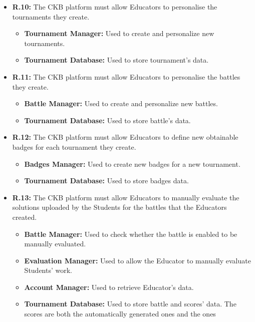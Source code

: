 \documentclass{article}
\begin{document}
{\begin{itemize}
\begin{itemize}
          \end{itemize}
    \item \textbf{R.10:} The CKB platform must allow Educators to personalise the tournaments they create.
          \begin{itemize}
              \item \textbf{Tournament Manager:} Used to create and personalize new tournaments.
              \item \textbf{Tournament Database:} Used to store tournament's data.
          \end{itemize}
    \item \textbf{R.11:} The CKB platform must allow Educators to personalise the battles they create.
          \begin{itemize}
              \item \textbf{Battle Manager:} Used to create and personalize new battles.
              \item \textbf{Tournament Database:} Used to store battle's data.
          \end{itemize}
    \item \textbf{R.12:} The CKB platform must allow Educators to define new obtainable badges for each tournament they
          create.
          \begin{itemize}
              \item \textbf{Badges Manager:} Used to create new badges for a new tournament.
              \item \textbf{Tournament Database:} Used to store badges data.
          \end{itemize}
    \item \textbf{R.13:} The CKB platform must allow Educators to manually evaluate the solutions uploaded by the Students for the battles that
          the Educators created.
          \begin{itemize}
              \item \textbf{Battle Manager:} Used to check whether the battle is enabled to be manually
              evaluated.
              \item \textbf{Evaluation Manager:} Used to allow the Educator to manually evaluate Students'
              work.
              \item \textbf{Account Manager:} Used to retrieve Educator's data.
              \item \textbf{Tournament Database:} Used to store battle and scores' data. The scores are both the automatically generated ones and the ones

\end{itemize}
\end{itemize}}
\end{document}

